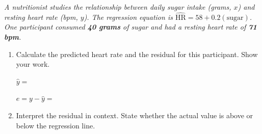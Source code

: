 \documentclass[10pt]{article}
\begin{document}
\namedateperiod

\vspace{0.18in}

\begin{tcolorbox}[colback=sky, colframe=navy, boxrule=0.9pt, arc=2mm,
    left=4mm, right=4mm, top=2.5mm, bottom=2.5mm]
\small\textit{A nutritionist studies the relationship between daily sugar intake (grams, $x$) and
resting heart rate (bpm, $y$). The regression equation is
$\widehat{\text{HR}} = 58 + 0.2(\text{sugar})$.
One participant consumed \textbf{40 grams} of sugar and had a resting heart rate of \textbf{71 bpm}.}
\end{tcolorbox}

\vspace{0.16in}

\begin{enumerate}[leftmargin=1.6em, itemsep=0.2in]

  \item Calculate the predicted heart rate and the residual for this participant. Show your work.

        \vspace{6pt}
        $\hat{y} = $ \blank{5cm}

        \vspace{6pt}
        $e = y - \hat{y} = $ \blank{5cm}

  \item Interpret the residual in context. State whether the actual value is above or below
        the regression line.\\[8pt]
        \writeline\\[3pt]\writeline\\[3pt]\writeline

\end{enumerate}

\vspace{0.16in}
\end{document}
